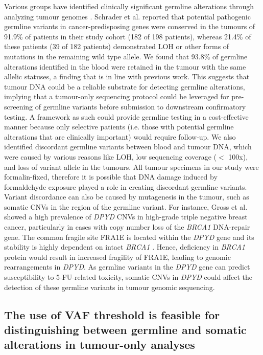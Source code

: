 Various groups have identified clinically significant germline alterations through analyzing tumour genomes \cite{Schrader2015, Meric-Bernstam2016, Jones2015a}. Schrader et al. \cite{Schrader2015} reported that potential pathogenic germline variants in cancer-predisposing genes were conserved in the tumours of 91.9\% of patients in their study cohort (182 of 198 patients), whereas 21.4\% of these patients (39 of 182 patients) demonstrated LOH or other forms of mutations in the remaining wild type allele. We found that 93.8\% of germline alterations identified in the blood were retained in the tumour with the same allelic statuses, a finding that is in line with previous work. This suggests that tumour DNA could be a reliable substrate for detecting germline alterations, implying that a tumour-only sequencing protocol could be leveraged for pre-screening of germline variants before submission to downstream confirmatory testing. A framework as such could provide germline testing in a cost-effective manner because only selective patients (i.e. those with potential germline alterations that are clinically important) would require follow-up. We also identified discordant germline variants between blood and tumour DNA, which were caused by various reasons like LOH, low sequencing coverage ($<$ 100x), and loss of variant allele in the tumours. All tumour specimens in our study were formalin-fixed, therefore it is possible that DNA damage induced by formaldehyde exposure played a role in creating discordant germline variants. Variant discordance can also be caused by mutagenesis in the tumour, such as somatic CNVs in the region of the germline variant. For instance, Gross et al. \cite{Gross2013} showed a high prevalence of \textit{DPYD} CNVs in high-grade triple negative breast cancer, particularly in cases with copy number loss of the \textit{BRCA1} DNA-repair gene. The common fragile site FRA1E is located within the \textit{DPYD} gene and its stability is highly dependent on intact \textit{BRCA1} \cite{Arlt2004}. Hence, deficiency in \textit{BRCA1} protein would result in increased fragility of FRA1E, leading to genomic rearrangements in \textit{DPYD}. As germline variants in the \textit{DPYD} gene can predict susceptibility to 5-FU-related toxicity, somatic CNVs in \textit{DPYD} could affect the detection of these germline variants in tumour genomic sequencing.

\subsection{The use of VAF threshold is feasible for distinguishing between germline and somatic alterations in tumour-only analyses}

